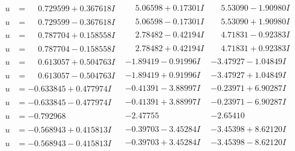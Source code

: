 \documentclass[1p]{elsarticle_modified}
\theoremstyle{definition}
\begin{document}
$$\begin{array}{c|c|c}
\begin{aligned}
u &= \phantom{-}0.729599 + 0.367618 I\end{aligned}
 & \phantom{-}5.06598 + 0.17301 I & \phantom{-}5.53090 - 1.90980 I \\ \hline\begin{aligned}
u &= \phantom{-}0.729599 - 0.367618 I\end{aligned}
 & \phantom{-}5.06598 - 0.17301 I & \phantom{-}5.53090 + 1.90980 I \\ \hline\begin{aligned}
u &= \phantom{-}0.787704 + 0.158558 I\end{aligned}
 & \phantom{-}2.78482 - 0.42194 I & \phantom{-}4.71831 - 0.92383 I \\ \hline\begin{aligned}
u &= \phantom{-}0.787704 - 0.158558 I\end{aligned}
 & \phantom{-}2.78482 + 0.42194 I & \phantom{-}4.71831 + 0.92383 I \\ \hline\begin{aligned}
u &= \phantom{-}0.613057 + 0.504763 I\end{aligned}
 & -1.89419 - 0.91996 I & -3.47927 - 1.04849 I \\ \hline\begin{aligned}
u &= \phantom{-}0.613057 - 0.504763 I\end{aligned}
 & -1.89419 + 0.91996 I & -3.47927 + 1.04849 I \\ \hline\begin{aligned}
u &= -0.633845 + 0.477974 I\end{aligned}
 & -0.41391 - 3.88997 I & -0.23971 + 6.90287 I \\ \hline\begin{aligned}
u &= -0.633845 - 0.477974 I\end{aligned}
 & -0.41391 + 3.88997 I & -0.23971 - 6.90287 I \\ \hline\begin{aligned}
u &= -0.792968\phantom{ +0.000000I}\end{aligned}
 & -2.47755\phantom{ +0.000000I} & -2.65410\phantom{ +0.000000I} \\ \hline\begin{aligned}
u &= -0.568943 + 0.415813 I\end{aligned}
 & -0.39703 - 3.45284 I & -3.45398 + 8.62120 I \\ \hline\begin{aligned}
u &= -0.568943 - 0.415813 I\end{aligned}
 & -0.39703 + 3.45284 I & -3.45398 - 8.62120 I \\ \hline\begin{aligned}

\end{aligned}
\end{array}$$
\end{document}
